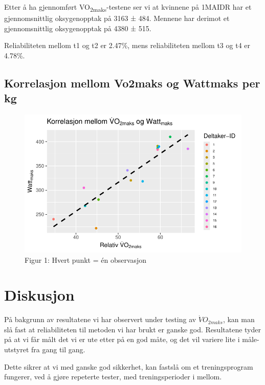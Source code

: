 \documentclass[
  letterpaper,
  DIV=11,
  numbers=noendperiod]{scrreprt}
\begin{document}
Etter å ha gjennomført VO\textsubscript{2maks}-testene ser vi at
kvinnene på 1MAIDR har et gjennomsnittlig oksygenopptak på 3163 ± 484.
Mennene har derimot et gjennomsnittlig oksygenopptak på 4380 ± 515.

Reliabiliteten mellom t1 og t2 er 2.47\%, mens reliabiliteten mellom t3
og t4 er 4.78\%.

\subsection{Korrelasjon mellom Vo2maks og Wattmaks per
kg}\label{korrelasjon-mellom-vo2maks-og-wattmaks-per-kg}

\begin{figure}[H]

{\centering \includegraphics{01-reliability-tools_files/figure-pdf/unnamed-chunk-10-1.pdf}

}

\caption{Figur 1: Hvert punkt = én observasjon}

\end{figure}%

\section{Diskusjon}\label{diskusjon}

På bakgrunn av resultatene vi har observert under testing av
\(\dot{V}O_{2maks}\), kan man slå fast at reliabiliteten til metoden vi
har brukt er ganske god. Resultatene tyder på at vi får målt det vi er
ute etter på en god måte, og det vil variere lite i måle-utstyret fra
gang til gang.

Dette sikrer at vi med ganske god sikkerhet, kan fastslå om et
treningsprogram fungerer, ved å gjøre repeterte tester, med
treningsperioder i mellom.
\end{document}
